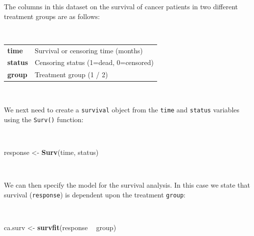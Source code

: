 \documentclass[12pt,a4paper]{book}
\newenvironment{Shaded}{\begin{snugshade}}{\end{snugshade}}
\newcommand{\KeywordTok}[1]{\textcolor[rgb]{0.13,0.29,0.53}{\textbf{#1}}}
\newcommand{\StringTok}[1]{\textcolor[rgb]{0.31,0.60,0.02}{#1}}
\newcommand{\OperatorTok}[1]{\textcolor[rgb]{0.81,0.36,0.00}{\textbf{#1}}}
\newcommand{\NormalTok}[1]{#1}
\theoremstyle{definition}
\theoremstyle{definition}
\theoremstyle{definition}
\theoremstyle{remark}
\begin{document}
The columns in this dataset on the survival of cancer patients in two
different treatment groups are as follows:

~

\begin{longtable}[]{@{}ll@{}}
\toprule
\begin{minipage}[t]{0.21\columnwidth}\raggedright
\textbf{time}\strut
\end{minipage} & \begin{minipage}[t]{0.54\columnwidth}\raggedright
Survival or censoring time (months)\strut
\end{minipage}\tabularnewline
\begin{minipage}[t]{0.21\columnwidth}\raggedright
\textbf{status}\strut
\end{minipage} & \begin{minipage}[t]{0.54\columnwidth}\raggedright
Censoring status (1=dead, 0=censored)\strut
\end{minipage}\tabularnewline
\begin{minipage}[t]{0.21\columnwidth}\raggedright
\textbf{group}\strut
\end{minipage} & \begin{minipage}[t]{0.54\columnwidth}\raggedright
Treatment group (1 / 2)\strut
\end{minipage}\tabularnewline
\bottomrule
\end{longtable}

~

We next need to create a \texttt{survival} object from the \texttt{time}
and \texttt{status} variables using the \texttt{Surv()} function:

~

\begin{Shaded}
\begin{Highlighting}[]
\NormalTok{response <-}\StringTok{ }\KeywordTok{Surv}\NormalTok{(time, status)}
\end{Highlighting}
\end{Shaded}

~

We can then specify the model for the survival analysis. In this case we
state that survival (\texttt{response}) is dependent upon the treatment
\texttt{group}:

~

\begin{Shaded}
\begin{Highlighting}[]
\NormalTok{ca.surv <-}\StringTok{ }\KeywordTok{survfit}\NormalTok{(response }\OperatorTok{~}\StringTok{ }\NormalTok{group)}
\end{Highlighting}
\end{Shaded}
\end{document}
